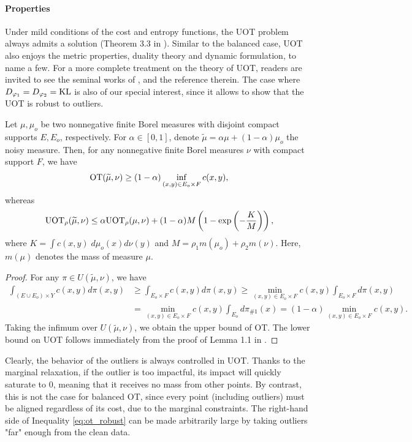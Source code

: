 \paragraph{Properties} Under mild conditions of the cost and entropy functions,
the UOT problem always admits a solution (Theorem 3.3 in \citep{Liero18}).
Similar to the balanced case, UOT also enjoys the metric properties, duality theory and
dynamic formulation, to name a few. For a more complete treatment on the theory of UOT,
readers are invited to see the seminal works of \citep{Liero18,Chizat18b}, and the reference therein.
The case where $D_{\varphi_1} = D_{\varphi_2} = \text{KL}$ is also of our special interest,
since it allows to show that the UOT is robust to outliers.
\begin{proposition}
  \label{prop:uot_robust}
  Let $\mu, \mu_o$ be two nonnegative finite Borel measures with disjoint compact supports $E, E_o$,
  respectively. For $\alpha \in [0, 1]$, denote $\widetilde{\mu} = \alpha \mu + (1 - \alpha) \mu_o$
  the noisy measure. Then, for any nonnegative finite Borel measures $\nu$
  with compact support $F$, we have
  \begin{align}
    \label{eq:ot_robust}
    \text{OT}(\widetilde{\mu}, \nu) \geq
    (1 - \alpha) \inf_{(x, y) \in E_o \times F} c(x, y),
  \end{align}
  whereas
  \begin{align}
    \text{UOT}_{\rho}(\widetilde{\mu}, \nu) \leq \alpha \text{UOT}_{\rho}(\mu, \nu) +
    (1 - \alpha) M
    \left( 1 - \exp \left( -\frac{K}{M} \right) \right),
  \end{align}
  where $K = \int c(x, y) \; d\mu_o(x) d\nu(y)$ and $M = \rho_1 m(\mu_o) + \rho_2 m(\nu)$.
  Here, $m(\mu)$ denotes the mass of measure $\mu$.
\end{proposition}
\begin{proof}
  For any $\pi \in U(\widetilde{\mu}, \nu)$, we have
  \begin{align}
      \int_{(E \cup E_o) \times Y} c(x, y) d\pi(x, y) &\geq \int_{E_o \times F} c(x, y) d\pi(x, y)
      \geq \min_{(x, y) \in E_o \times F} c(x, y ) \int_{E_o \times F} d\pi(x, y) \\
      &= \min_{(x, y) \in E_o \times F} c(x, y) \int_{E_o} d\pi_{\# 1}(x)
      = (1 - \alpha) \min_{(x, y) \in E_o \times F} c(x, y).
  \end{align}
  Taking the infimum over $U(\widetilde{\mu}, \nu)$, we obtain the upper bound of OT.
  The lower bound on UOT follows immediately from the proof of Lemma 1.1 in \citep{Fatras21}.
\end{proof}
Clearly, the behavior of the outliers is always controlled in UOT.
Thanks to the marginal relaxation, if the outlier is too impactful,
its impact will quickly saturate to $0$, meaning that it receives no mass from other points.
By contrast, this is not the case for balanced OT, since every point (including outliers)
must be aligned regardless of its cost, due to the marginal constraints. The right-hand side of
Inequality \eqref{eq:ot_robust} can be made arbitrarily large by taking outliers "far" enough
from the clean data.

